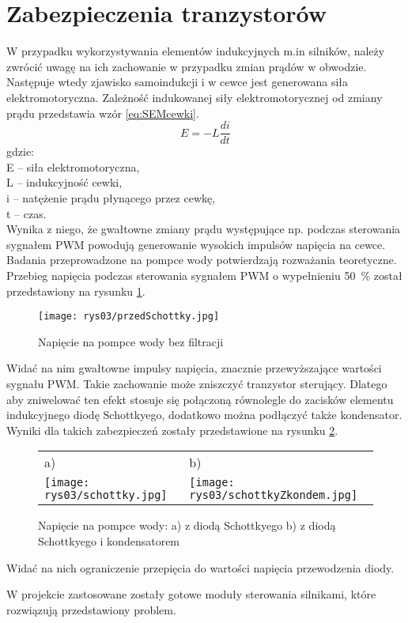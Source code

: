 	\section{Zabezpieczenia tranzystorów}
	    W przypadku wykorzystywania elementów indukcyjnych m.in silników, należy zwrócić uwagę na ich zachowanie w przypadku zmian prądów w obwodzie. Następuje wtedy zjawisko samoindukcji i w cewce jest generowana siła elektromotoryczna. Zależność indukowanej siły elektromotorycznej od zmiany prądu przedstawia wzór \ref{eq:SEMcewki}.
	    \begin{equation}
	        E = -L \frac{di}{dt}
	        \label{eq:SEMcewki}
	    \end{equation}
	    gdzie: \\
	    E  – siła elektromotoryczna, \\
	    L – indukcyjność cewki, \\
        i – natężenie prądu płynącego przez cewkę, \\
        t – czas. \\
        Wynika z niego, że gwałtowne zmiany prądu występujące np. podczas sterowania sygnałem PWM powodują generowanie wysokich impulsów napięcia na cewce. Badania przeprowadzone na pompce wody potwierdzają rozważania teoretyczne. Przebieg napięcia podczas sterowania sygnałem PWM o wypełnieniu \SI{50}{\percent} został przedstawiony na rysunku \ref{fig:pompkaBezFiltracji}.
        \begin{figure}[ht]
			\centering
			\texttt{[image: rys03/przedSchottky.jpg]}
			\caption{Napięcie na pompce wody bez filtracji}
			\label{fig:pompkaBezFiltracji}
		\end{figure}
		Widać na nim gwałtowne impulsy napięcia, znacznie przewyższające wartości sygnału PWM. Takie zachowanie może zniszczyć tranzystor sterujący. Dlatego aby zniwelować ten efekt stosuje się połączoną równolegle do zacisków elementu indukcyjnego diodę Schottkyego, dodatkowo można podłączyć także kondensator. Wyniki dla takich zabezpieczeń zostały przedstawione na rysunku \ref{fig:pompkaFiltracja}.
		\begin{figure}[ht]
			\centering
			\begin{tabular}{@{}ll@{}}
				a) & b) \\
				\texttt{[image: rys03/schottky.jpg]} & 
				\texttt{[image: rys03/schottkyZkondem.jpg]} \\
			\end{tabular}
			\caption{Napięcie na pompce wody: a) z diodą Schottkyego b) z diodą Schottkyego i kondensatorem}
			\label{fig:pompkaFiltracja}
		\end{figure}
		Widać na nich ograniczenie przepięcia do wartości napięcia przewodzenia diody.
		
		W projekcie zastosowane zostały gotowe moduły sterowania silnikami, które rozwiązują przedstawiony problem.